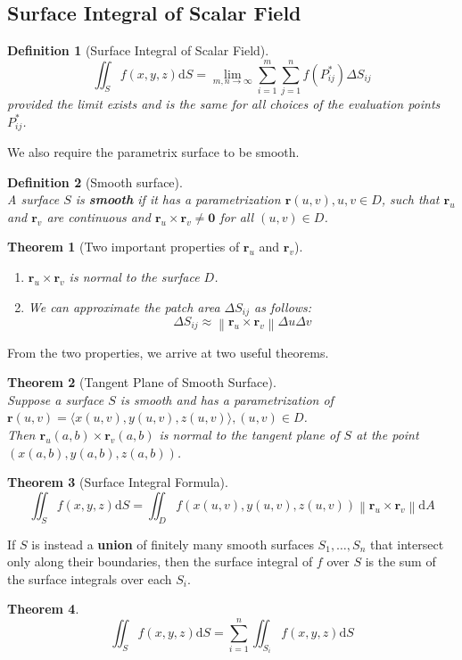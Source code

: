 \documentclass[12pt]{article}
\newcommand\norm[1]{\left\lVert#1\right\rVert}
\newtheorem{definition}{Definition}[section]
\newtheorem{theorem}{Theorem}[section]
\theoremstyle{definition}
\newcommand{\diff}{\mathrm{d}}
\begin{document}
\subsection{Surface Integral of Scalar Field}
\begin{definition}[Surface Integral of Scalar Field]
\hfill\\\normalfont
\[
\iint_Sf(x,y,z)\diff S = \lim_{m,n\to \infty}\sum_{i=1}^m\sum_{j=1}^nf(P_{ij}^\ast)\Delta S_{ij}
\]
provided the limit exists and is the same for all choices of the evaluation points $P_{ij}^\ast$.
\end{definition}
We also require the parametrix surface to be smooth.
\begin{definition}[Smooth surface]\hfill\\\normalfont
A surface $S$ is \textbf{smooth} if it has a parametrization $\mathbf{r}(u,v), u,v\in D$, such that $\mathbf{r}_u$ and $\mathbf{r}_v$ are continuous and $\mathbf{r}_u\times\mathbf{r}_v\neq \mathbf{0}$ for all $(u,v)\in D$.
\end{definition}
\begin{theorem}[Two important properties of {$\mathbf{r}_u$} and {$\mathbf{r}_v$}]
\hfill\\\normalfont 
\begin{enumerate}
  \item $\mathbf{r}_u\times\mathbf{r}_v$ is normal to the surface $D$.
  \item We can approximate the patch area $\Delta S_{ij}$ as follows:
  \[
\Delta S_{ij} \approx \norm{\mathbf{r}_u\times\mathbf{r}_v}\Delta u\Delta v
  \]
\end{enumerate}
\end{theorem}
From the two properties, we arrive at two useful theorems.
\begin{theorem}[Tangent Plane of Smooth Surface]\hfill\\\normalfont Suppose a surface $S$ is smooth and has a parametrization of $\mathbf{r}(u,v) = \langle x(u,v), y(u,v), z(u,v)\rangle, (u,v)\in D$.\\Then $\mathbf{r}_u(a,b)\times \mathbf{r}_v(a,b)$ is normal to the tangent plane of $S$ at the point $(x(a,b),y(a,b),z(a,b))$.
\end{theorem}
\begin{theorem}[Surface Integral Formula]
\hfill\\\normalfont
\[ \iint_Sf(x,y,z)\diff S = \iint_Df(x(u,v),y(u,v),z(u,v))\norm{\mathbf{r}_u\times\mathbf{r}_v}\diff A
\]
\end{theorem}
If $S$ is instead a \textbf{union} of finitely many smooth surfaces $S_1,\ldots,S_n$ that intersect only along their boundaries, then the surface integral of $f$ over $S$ is the sum of the surface integrals over each $S_i$.
\begin{theorem}\hfill\\\normalfont
\[
\iint_S f(x,y,z)\diff S = \sum_{i=1}^n \iint_{S_i}f(x,y,z)\diff S
\]
\end{theorem}
\end{document}
